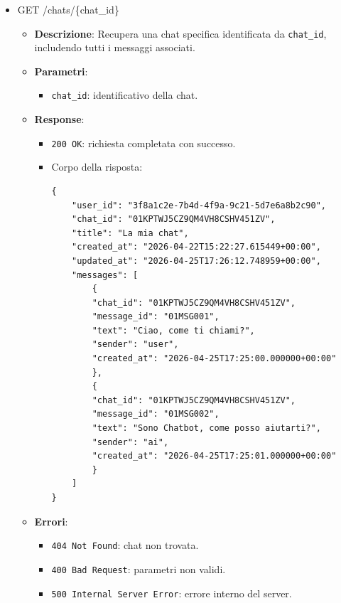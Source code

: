 \documentclass[a4paper,12pt]{article}
\newcommand{\code}[1]{{\ttfamily\textcolor{purple!85!black}{#1}}}
\begin{document}
\begin{itemize}
    \item \code{GET /chats/\{chat\_id\}}
        \begin{itemize}
            \item \textbf{Descrizione}: Recupera una chat specifica identificata da \texttt{chat\_id}, includendo tutti i messaggi associati.
        
            \item \textbf{Parametri}:
            \begin{itemize}
                \item \texttt{chat\_id}: identificativo della chat.
            \end{itemize}
        
            \item \textbf{Response}:
            \begin{itemize}
                \item \texttt{200 OK}: richiesta completata con successo.
                \item Corpo della risposta:
\begin{verbatim}
{
    "user_id": "3f8a1c2e-7b4d-4f9a-9c21-5d7e6a8b2c90",
    "chat_id": "01KPTWJ5CZ9QM4VH8CSHV451ZV",
    "title": "La mia chat",
    "created_at": "2026-04-22T15:22:27.615449+00:00",
    "updated_at": "2026-04-25T17:26:12.748959+00:00",
    "messages": [
        {
        "chat_id": "01KPTWJ5CZ9QM4VH8CSHV451ZV",
        "message_id": "01MSG001",
        "text": "Ciao, come ti chiami?",
        "sender": "user",
        "created_at": "2026-04-25T17:25:00.000000+00:00"
        },
        {
        "chat_id": "01KPTWJ5CZ9QM4VH8CSHV451ZV",
        "message_id": "01MSG002",
        "text": "Sono Chatbot, come posso aiutarti?",
        "sender": "ai",
        "created_at": "2026-04-25T17:25:01.000000+00:00"
        }
    ]
}
        \end{verbatim}
            \end{itemize}
        
            \item \textbf{Errori}:
            \begin{itemize}
                \item \texttt{404 Not Found}: chat non trovata.
                \item \texttt{400 Bad Request}: parametri non validi.
                \item \texttt{500 Internal Server Error}: errore interno del server.
            \end{itemize}
        \end{itemize}


\end{itemize}
\end{document}
